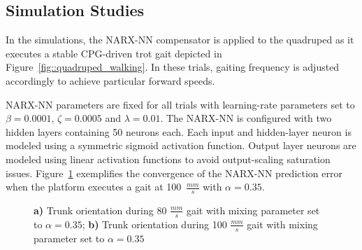 \subsection{Simulation Studies}


In the simulations, the NARX-NN compensator is applied to the quadruped as it executes a stable CPG-driven trot gait depicted in  Figure~\ref{fig::quadruped_walking}. In these trials, gaiting frequency is adjusted accordingly to achieve particular forward speeds.

NARX-NN parameters are fixed for all trials with learning-rate  parameters set to $\beta=0.0001$, $\zeta=0.0005$ and $\lambda = 0.01$. The NARX-NN is configured with two hidden layers containing 50 neurons each. Each input and hidden-layer neuron is modeled using a symmetric sigmoid activation function. Output layer neurons are modeled using linear activation functions to avoid output-scaling saturation issues. Figure~\ref{fig::fast} exemplifies the convergence of the NARX-NN prediction error when the platform executes a gait at  100~$\frac{mm}{s}$ with $\alpha = 0.35$.

\begin{figure}[h!]
	\centering
	\begin{subfigure}{0.475\textwidth}
		\centering
		\caption{ }
	\end{subfigure}
	\begin{subfigure}{0.475\textwidth}
		\centering
		\caption{ } 
	\end{subfigure}
	\caption{ 
		\textbf{a)} Trunk orientation during 80 $\frac{mm}{s}$ gait with mixing parameter set to $\alpha = 0.35$;
		\textbf{b)} Trunk orientation during 100 $\frac{mm}{s}$ gait with mixing parameter set to $\alpha = 0.35$
	}
	\label{fig::fast}
	\vspace{-3mm}
\end{figure}

